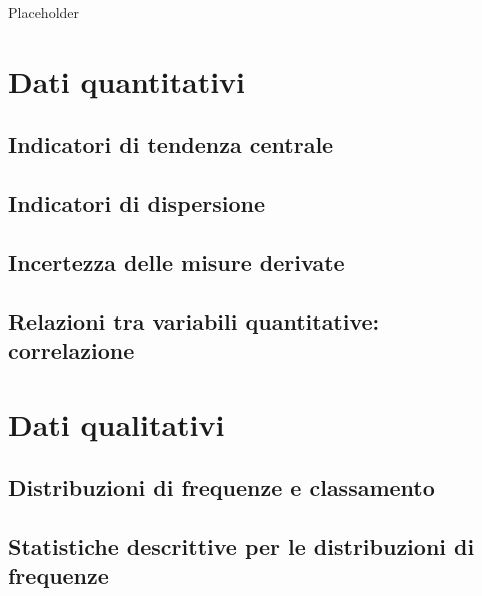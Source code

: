\documentclass[a4paper,12pt,oneside]{book}
\begin{document}
Placeholder

\hypertarget{dati-quantitativi}{%
\section{Dati quantitativi}\label{dati-quantitativi}}

\hypertarget{indicatori-di-tendenza-centrale}{%
\subsection{Indicatori di tendenza centrale}\label{indicatori-di-tendenza-centrale}}

\hypertarget{indicatori-di-dispersione}{%
\subsection{Indicatori di dispersione}\label{indicatori-di-dispersione}}

\hypertarget{incertezza-delle-misure-derivate}{%
\subsection{Incertezza delle misure derivate}\label{incertezza-delle-misure-derivate}}

\hypertarget{relazioni-tra-variabili-quantitative-correlazione}{%
\subsection{Relazioni tra variabili quantitative: correlazione}\label{relazioni-tra-variabili-quantitative-correlazione}}

\hypertarget{dati-qualitativi}{%
\section{Dati qualitativi}\label{dati-qualitativi}}

\hypertarget{distribuzioni-di-frequenze-e-classamento}{%
\subsection{Distribuzioni di frequenze e classamento}\label{distribuzioni-di-frequenze-e-classamento}}

\hypertarget{statistiche-descrittive-per-le-distribuzioni-di-frequenze}{%
\subsection{Statistiche descrittive per le distribuzioni di frequenze}\label{statistiche-descrittive-per-le-distribuzioni-di-frequenze}}
\end{document}
